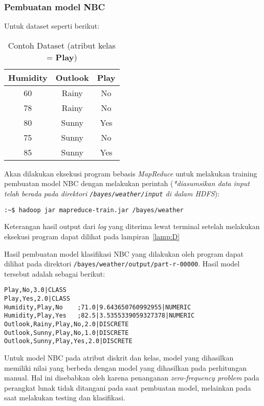 \subsubsection{Pembuatan model NBC}
\label{subsubsec:Pembuatan model naive bayes classifier}

Untuk dataset seperti berikut:
\begin{table}[H]
\label{tab:dataset-pl}
\centering
\caption{Contoh Dataset (atribut kelas = \textbf{Play})}
\begin{tabular}{ | c | c | c | }
\hline
	Humidity & Outlook & \textbf{Play}\\ \hline \hline
60 & Rainy & No\\ \hline
78 & Rainy & No\\ \hline
80 & Sunny & Yes\\ \hline
75 & Sunny & No\\ \hline
85 & Sunny & Yes \\ \hline
\end{tabular}
\end{table}

Akan dilakukan eksekusi program bebasis \textit{MapReduce} untuk melakukan training pembuatan model NBC dengan melakukan perintah (\textit{*diasumsikan data input telah berada pada direktori \texttt{/bayes/weather/input} di dalam HDFS}):
\begin{lstlisting}
:~$ hadoop jar mapreduce-train.jar /bayes/weather
\end{lstlisting}

Keterangan hasil output dari \textit{log} yang diterima lewat terminal setelah melakukan eksekusi program dapat dilihat pada lampiran~\ref{lamp:D}

Hasil pembuatan model klasifikasi NBC yang dilakukan oleh program dapat dilihat pada direktori \texttt{/bayes/weather/output/part-r-00000}. Hasil model tersebut adalah sebagai berikut:
\begin{lstlisting}
Play,No,3.0|CLASS	
Play,Yes,2.0|CLASS	
Humidity,Play,No	;71.0|9.643650760992955|NUMERIC
Humidity,Play,Yes	;82.5|3.5355339059327378|NUMERIC
Outlook,Rainy,Play,No,2.0|DISCRETE	
Outlook,Sunny,Play,No,1.0|DISCRETE	
Outlook,Sunny,Play,Yes,2.0|DISCRETE
\end{lstlisting}

Untuk model NBC pada atribut diskrit dan kelas, model yang dihasilkan memiliki nilai yang berbeda dengan model yang dihasilkan pada perhitungan manual. Hal ini disebabkan oleh karena penanganan \textit{zero-frequency problem} pada perangkat lunak tidak ditangani pada saat pembuatan model, melainkan pada saat melakukan testing dan klasifikasi.

